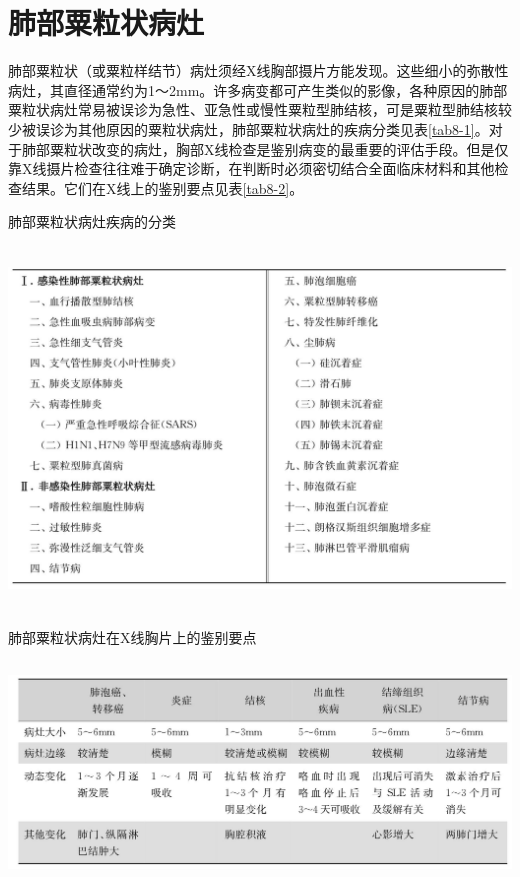 \chapter{肺部粟粒状病灶}

肺部粟粒状（或粟粒样结节）病灶须经X线胸部摄片方能发现。这些细小的弥散性病灶，其直径通常约为1～2mm。许多病变都可产生类似的影像，各种原因的肺部粟粒状病灶常易被误诊为急性、亚急性或慢性粟粒型肺结核，可是粟粒型肺结核较少被误诊为其他原因的粟粒状病灶，肺部粟粒状病灶的疾病分类见表\ref{tab8-1}。对于肺部粟粒状改变的病灶，胸部X线检查是鉴别病变的最重要的评估手段。但是仅靠X线摄片检查往往难于确定诊断，在判断时必须密切结合全面临床材料和其他检查结果。它们在X线上的鉴别要点见表\ref{tab8-2}。

\begin{table}[htbp]
\centering
\caption{肺部粟粒状病灶疾病的分类}
\label{tab8-1}
\includegraphics[width=5.94792in,height=3.79167in]{./images/Image00062.jpg}
\end{table}

\begin{table}[htbp]
\centering
\caption{肺部粟粒状病灶在X线胸片上的鉴别要点}
\label{tab8-2}
\includegraphics[width=6in,height=2.29167in]{./images/Image00063.jpg}
\end{table}

